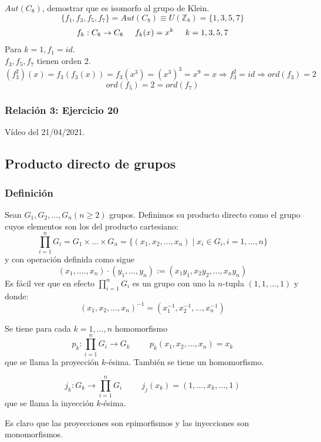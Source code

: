 \documentclass[11pt,a4paper]{article}
\begin{document}
$Aut(C_{8})$, demostrar que es isomorfo al grupo de Klein.
$$\{f_{1}, f_{3}, f_{5}, f_{7}\} = Aut(C_{8}) \equiv U(\mathbb{Z}_{8}) = \{1,3,5,7\}$$
$$f_{k}: C_{8} \to C_{8} \hspace{0.5cm} f_{k}(x) = x^{k} \hspace{0.5cm} k = 1, 3, 5, 7$$
Para $k = 1, f_{1} = id$. \\
$f_{3}, f_{5}, f_{7}$ tienen orden 2.
$$(f_{3}^{2})(x) = f_{3}(f_{3}(x)) = f_{3}(x^{3}) = (x^{3})^{3} = x^{9} = x \Rightarrow f_{3}^{2} = id \Rightarrow ord(f_{3}) = 2$$
$$ord(f_{5}) = 2 = ord(f_{7})$$

\subsubsection*{Relación 3: Ejercicio 20}

Vídeo del 21/04/2021.

\subsection{Producto directo de grupos}

\subsubsection*{Definición}

Sean $G_{1}, G_{2}, ..., G_{n} (n \geq 2)$ grupos. Definimos su producto directo como el grupo cuyos elementos son los del producto cartesiano:
$$\prod_{i=1}^{n} G_{i} = G_{1} \times ... \times G_{n} = \{(x_{1}, x_{2}, ..., x_{n}) \mid x_{i} \in G_{i}, i = 1, ..., n\}$$
y con operación definida como sigue
$$(x_{1}, ...., x_{n}) \cdot (y_{1}, ..., y_{n}) := (x_{1}y_{1}, x_{2}y_{2}, ..., x_{n}y_{n})$$
Es fácil ver que en efecto $\prod_{i=1}^{n} G_{i}$ es un grupo con uno la $n$-tupla $(1, 1, ..., 1)$ y donde:
$$(x_{1}, x_{2}, ..., x_{n})^{-1} = (x_{1}^{-1}, x_{2}^{-1}, ..., x_{n}^{-1})$$

Se tiene para cada $k = 1, ..., n$ homomorfismo
$$p_{k}: \prod_{i=1}^{n} G_{i} \to G_{k} \hspace{1cm} p_{k}(x_{1}, x_{2}, ..., x_{n}) = x_{k}$$
que se llama la proyección $k$-ésima. También se tiene un homomorfismo.

$$j_{k}: G_{k} \to \prod_{i=1}^{n} G_{i} \hspace{1cm} j_{j}(x_{k}) = (1, ..., x_{k}, ..., 1)$$
que se llama la inyección $k$-ésima.

Es claro que las proyecciones son epimorfismos y las inyecciones son monomorfismos.
\end{document}

